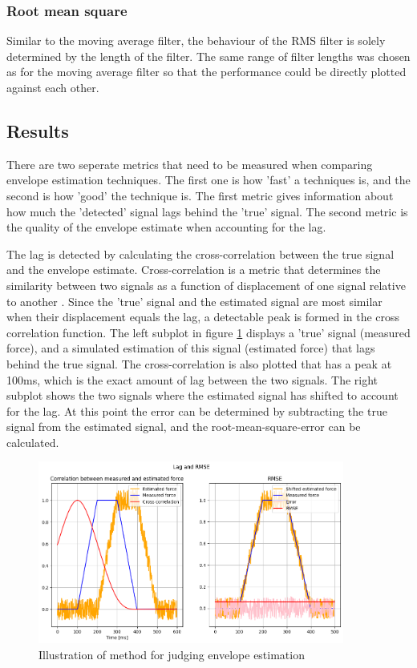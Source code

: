 \subsubsection{Root mean square}
Similar to the moving average filter, the behaviour of the RMS filter is solely determined by the length of the filter. The same range of filter lengths was chosen as for the moving average filter so that the performance could be directly plotted against each other.

\subsection{Results}
There are two seperate metrics that need to be measured when comparing envelope estimation techniques. The first one is how 'fast' a techniques is, and the second is how 'good' the technique is. The first metric gives information about how much the 'detected' signal lags behind the 'true' signal. The second metric is the quality of the envelope estimate when accounting for the lag. 

The lag is detected by calculating the cross-correlation between the true signal and the envelope estimate. Cross-correlation is a metric that determines the similarity between two signals as a function of displacement of one signal relative to another \cite{wiki:cross_correlation}. Since the 'true' signal and the estimated signal are most similar when their displacement equals the lag, a detectable peak is formed in the cross correlation function. The left subplot in figure \ref{fig:envelope_estimation_method} displays a 'true' signal (measured force), and a simulated estimation of this signal (estimated force) that lags behind the true signal. The cross-correlation is also plotted that has a peak at 100ms, which is the exact amount of lag between the two signals. The right subplot shows the two signals where the estimated signal has shifted to account for the lag. At this point the error can be determined by subtracting the true signal from the estimated signal, and the root-mean-square-error can be calculated. 

\begin{figure}[h!t]
	\begin{center}
		\includegraphics[height=60mm]{images/envelope_estimation_method.png}
	\end{center}
	\caption{Illustration of method for judging envelope estimation}
	\label{fig:envelope_estimation_method}
\end{figure}

